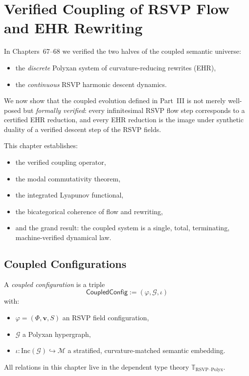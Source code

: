\chapter{Verified Coupling of RSVP Flow and EHR Rewriting}
\label{ch:69}

In Chapters~67--68 we verified the two halves of the coupled semantic universe:
\begin{itemize}
\item the \emph{discrete} Polyxan system of curvature-reducing rewrites (EHR),
\item the \emph{continuous} RSVP harmonic descent dynamics.
\end{itemize}
We now show that the coupled evolution defined in Part~III is not merely 
well-posed but \emph{formally verified}: every infinitesimal RSVP flow step 
corresponds to a certified EHR reduction, and every EHR reduction is the image 
under synthetic duality of a verified descent step of the RSVP fields.

This chapter establishes:
\begin{itemize}
\item the verified coupling operator,
\item the modal commutativity theorem,
\item the integrated Lyapunov functional,
\item the bicategorical coherence of flow and rewriting,
\item and the grand result: the coupled system is a single, total, terminating, 
      machine-verified dynamical law.
\end{itemize}

\section{Coupled Configurations}

A \emph{coupled configuration} is a triple
\[
\mathsf{CoupledConfig}
  := (\varphi,\mathcal{G},\iota)
\]
with:
\begin{itemize}
\item $\varphi=(\Phi,\mathbf{v},S)$ an RSVP field configuration,
\item $\mathcal{G}$ a Polyxan hypergraph,
\item $\iota : \mathrm{Inc}(\mathcal{G}) \hookrightarrow \mathcal{M}$ a 
      stratified, curvature-matched semantic embedding.
\end{itemize}

All relations in this chapter live in the dependent type theory 
$\mathbb{T}_{\mathrm{RSVP\text{--}Polyx}}$.

